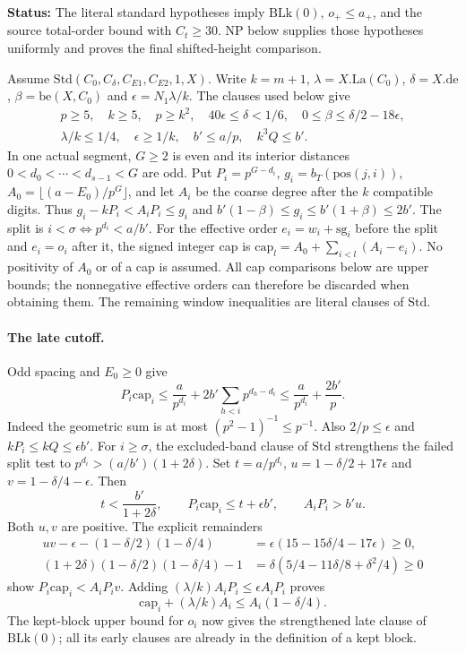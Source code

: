 \documentclass[11pt,a4paper]{article}
\numberwithin{equation}{section}
\theoremstyle{remark}\newtheorem{remark}[theorem]{Remark}
\newcommand{\status}[1]{\textbf{Status:} #1}
\begin{document}
\status{The literal standard hypotheses imply $\mathrm{BLk}(0)$,
$o_+\le a_+$, and the source total-order bound with $C_t\ge30$.
NP below supplies those hypotheses uniformly and proves the final shifted-height comparison.}

Assume $\mathrm{Std}(C_0,C_\delta,C_{E1},C_{E2},1,X)$.
Write $k=m+1$, $\lambda=X.\mathrm{La}(C_0)$, $\delta=X.\mathrm{de}$,
$\beta=\mathrm{be}(X,C_0)$ and $\epsilon=N_1\lambda/k$.
The clauses used below give
\[
 \begin{gathered}
 p\ge5,\quad k\ge5,\quad p\ge k^2,\quad
 40\epsilon\le\delta<1/6,\quad
 0\le\beta\le\delta/2-18\epsilon,\\
 \lambda/k\le1/4,\quad \epsilon\ge1/k,\quad
 b'\le a/p,\quad k^3Q\le b'.
 \end{gathered}
\]
In one actual segment, $G\ge2$ is even and its interior distances
$0<d_0<\cdots<d_{s-1}<G$ are odd. Put $P_i=p^{G-d_i}$,
$g_i=b_T(\mathrm{pos}(j,i))$, $A_0=\lfloor(a-E_0)/p^G\rfloor$,
and let $A_i$ be the coarse degree after the $k$ compatible digits.
Thus $g_i-kP_i<A_iP_i\le g_i$ and
$b'(1-\beta)\le g_i\le b'(1+\beta)\le2b'$.
The split is $i<\sigma\iff p^{d_i}<a/b'$.
For the effective order $e_i=w_i+\mathrm{sg}_i$ before the split and
$e_i=o_i$ after it, the signed integer cap is
$\mathrm{cap}_l=A_0+\sum_{i<l}(A_i-e_i)$.
No positivity of $A_0$ or of a cap is assumed. All cap comparisons below
are upper bounds; the nonnegative effective orders can therefore be
discarded when obtaining them. The remaining window inequalities are
literal clauses of $\mathrm{Std}$.

\paragraph{The late cutoff.}
Odd spacing and $E_0\ge0$ give
\[
 P_i\mathrm{cap}_i
 \le\frac a{p^{d_i}}+2b'\sum_{h<i}p^{d_h-d_i}
 \le\frac a{p^{d_i}}+\frac{2b'}p.
 \tag{SW.12a}
\]
Indeed the geometric sum is at most $(p^2-1)^{-1}\le p^{-1}$.
Also $2/p\le\epsilon$ and $kP_i\le kQ\le\epsilon b'$.
For $i\ge\sigma$, the excluded-band clause of $\mathrm{Std}$ strengthens
the failed split test to $p^{d_i}>(a/b')(1+2\delta)$.
Set $t=a/p^{d_i}$, $u=1-\delta/2+17\epsilon$ and
$v=1-\delta/4-\epsilon$. Then
\[
 t<\frac{b'}{1+2\delta},\qquad
 P_i\mathrm{cap}_i\le t+\epsilon b',\qquad A_iP_i>b'u.
\]
Both $u,v$ are positive. The explicit remainders
\[
\begin{aligned}
 uv-\epsilon-(1-\delta/2)(1-\delta/4)
   &=\epsilon(15-15\delta/4-17\epsilon)\ge0,\\
 (1+2\delta)(1-\delta/2)(1-\delta/4)-1
   &=\delta(5/4-11\delta/8+\delta^2/4)\ge0
\end{aligned}
\]
show $P_i\mathrm{cap}_i<A_iP_i v$.
Adding $(\lambda/k)A_iP_i\le\epsilon A_iP_i$ proves
\[
 \mathrm{cap}_i+(\lambda/k)A_i\le A_i(1-\delta/4).
 \tag{SW.12b}
\]
The kept-block upper bound for $o_i$ now gives the strengthened late
clause of $\mathrm{BLk}(0)$; all its early clauses are already in
the definition of a kept block.
\end{document}
